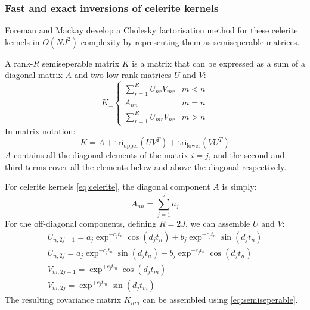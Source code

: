 \subsubsection{Fast and exact inversions of celerite kernels}
Foreman and Mackay \cite{foreman-mackay} develop a Cholesky factorisation method for these celerite kernels in $O(NJ^2)$ complexity by representing them as semiseperable matrices. 

A rank-$R$ semiseperable matrix $K$ is a matrix that can be expressed as a sum of a diagonal matrix $A$ and two low-rank matrices $U$ and $V$:
\begin{equation} \label{eq:semiseperable-cases}
    K_ = \begin{cases}
        \sum_{r=1}^R U_{nr} V_{mr} & m < n \\
        A_{nn} & m = n \\
        \sum_{r=1}^R U_{mr} V_{nr} & m > n
    \end{cases}
\end{equation}
In matrix notation:
\begin{equation} \label{eq:semiseperable-matrix}
    K = A + \text{tri}_{\text{upper}}(U V^T) + \text{tri}_{\text{lower}}(V U^T)
\end{equation}
$A$ contains all the diagonal elements of the matrix $i = j$, and the second and third terms cover all the elements below and above the diagonal respectively.

For celerite kernels \ref{eq:celerite}, the diagonal component $A$ is simply:
\begin{equation*}
    A_{nn} = \sum_{j=1}^J a_j
\end{equation*} \cite{foreman-mackay}
For the off-diagonal components, defining $R = 2J$, we can assemble $U$ and $V$:
\begin{equation*}
    \begin{aligned}
        U_{n, 2j-1} = a_j \exp^{-c_j t_n} \cos(d_j t_n) + b_j \exp^{-c_j t_n} \sin(d_j t_n) \\
        U_{n, 2j} = a_j \exp^{-c_j t_n} \sin(d_j t_n) - b_j \exp^{-c_j t_n} \cos(d_j t_n) \\
        V_{m, 2j-1} = \exp^{+c_j t_m} \cos(d_j t_m) \\
        V_{m, 2j} = \exp^{+c_j t_m} \sin(d_j t_m)
    \end{aligned}
\end{equation*} \cite{foreman-mackay}
The resulting covariance matrix $K_{nm}$ can be assembled using \ref{eq:semiseperable}. 

